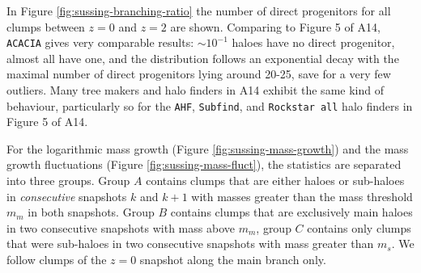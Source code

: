 In Figure \ref{fig:sussing-branching-ratio} the number of direct progenitors for all clumps between 
$z = 0$ and $z = 2$ are shown. Comparing to Figure 5 of A14, \texttt{ACACIA} gives very comparable 
results: $\sim 10^{-1}$ haloes have no direct progenitor, almost all have one, and the distribution 
follows an exponential decay with the maximal number of direct progenitors lying around 20-25, save 
for a very few outliers. Many tree makers and halo finders in A14 exhibit the same kind of 
behaviour, particularly so for the \texttt{AHF}, \texttt{Subfind}, and \texttt{Rockstar all} halo 
finders in Figure 5 of A14.


For the logarithmic mass growth (Figure \ref{fig:sussing-mass-growth}) and the mass growth fluctuations (Figure \ref{fig:sussing-mass-fluct}), the statistics are separated into three groups.
Group $A$ contains clumps that are either haloes or sub-haloes in \emph{consecutive} snapshots $k$ 
and $k+1$ with masses greater than the mass threshold $m_m$ in both snapshots. Group $B$ contains 
clumps that are exclusively main haloes in two consecutive snapshots with mass above $m_{m}$, group 
$C$ contains only clumps that were sub-haloes in two consecutive snapshots with mass greater than 
$m_{s}$. We follow clumps of the $z = 0$ snapshot along the main branch only.

